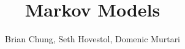 \documentclass[12pt]{article}
\begin{document}
\title{Markov Models}
\author{Brian Chung, Seth Hovestol, Domenic Murtari}
\maketitle









\end{document}
